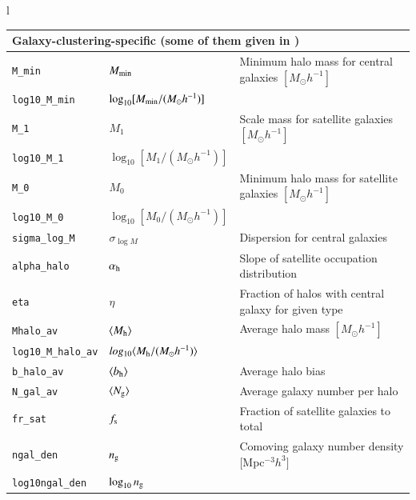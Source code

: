 \documentclass[11pt, chapterprefix, headsepline]{scrartcl}
\begin{document}
\begin{longtable}{l}
\begin{minipage}{\textwidth}
  \begin{tabularx}{\textwidth}{llX}
  \\
   \hline \multicolumn{3}{l}{\rul Galaxy-clustering-specific \quad (some of them given in \file{halomodel.par})} \\ \hline
   \texttt{M\_min}    & $M_{\rm min}$ & Minimum halo mass for central galaxies $[M_\odot h^{-1}]$ \\
   \texttt{log10\_M\_min} & $\log_{10} [M_{\rm min}/(M_\odot h^{-1})]$ & \\
   \texttt{M\_1}    & $M_1$ & Scale mass for satellite galaxies $[M_\odot h^{-1}]$\\
   \texttt{log10\_M\_1} & $\log_{10} [M_1/(M_\odot h^{-1})]$ & \\
   \texttt{M\_0}    & $M_{0}$ & Minimum halo mass for satellite galaxies $[M_\odot h^{-1}]$ \\
   \texttt{log10\_M\_0} & $\log_{10} [M_0/(M_\odot h^{-1})]$ & \\
   \texttt{sigma\_log\_M} & $\sigma_{\log M}$ & Dispersion for central galaxies \\
   \texttt{alpha\_halo}   & $\alpha_{\rm h}$ & Slope of satellite occupation distribution \\
   \texttt{eta}           & $\eta$ & Fraction of halos with central galaxy for given type \\
   \texttt{Mhalo\_av\ded} & $\langle M_{\rm h} \rangle$ & Average halo mass $[M_\odot h^{-1}]$ \\
   \texttt{log10\_M\_halo\_av\ded}  & $log_{10} \langle M_{\rm h}/(M_\odot h^{-1}) \rangle$ & \\
   \texttt{b\_halo\_av\ded} & $\langle b_{\rm h}\rangle$  & Average halo bias \\
   \texttt{N\_gal\_av\ded}  & $\langle N_{\rm g} \rangle$ & Average galaxy number per halo \\
   \texttt{fr\_sat\ded}     & $f_{\rm s}$ & Fraction of satellite galaxies to total \\
   \texttt{ngal\_den\ded} & $n_{\rm g}$ & Comoving galaxy number density [Mpc$^{-3} h^3]$ \\
   \texttt{log10ngal\_den\ded} & $\log_{10} n_{\rm g}$ & \\
\hline\hline
\end{tabularx}
\end{minipage}

\end{longtable}
\end{document}
